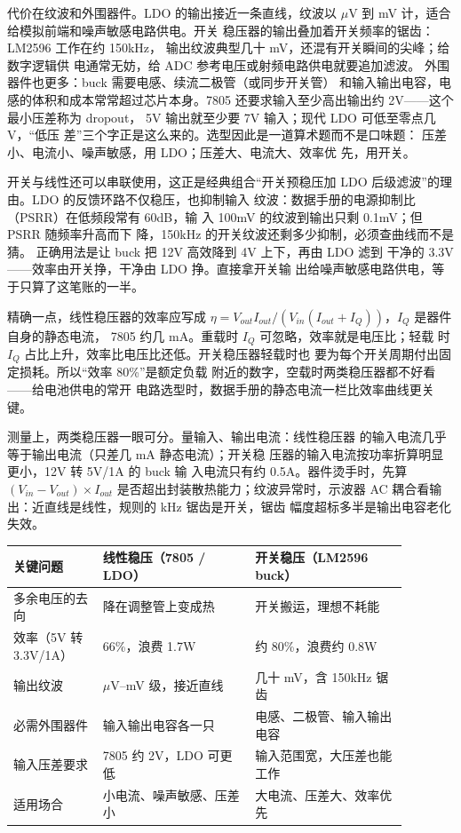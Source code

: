 代价在纹波和外围器件。LDO 的输出接近一条直线，纹波以
$\mu$V 到 mV 计，适合给模拟前端和噪声敏感电路供电。开关
稳压器的输出叠加着开关频率的锯齿：LM2596 工作在约 150kHz，
输出纹波典型几十 mV，还混有开关瞬间的尖峰；给数字逻辑供
电通常无妨，给 ADC 参考电压或射频电路供电就要追加滤波。
外围器件也更多：buck 需要电感、续流二极管（或同步开关管）
和输入输出电容，电感的体积和成本常常超过芯片本身。7805
还要求输入至少高出输出约 2V——这个最小压差称为 dropout，
5V 输出就至少要 7V 输入；现代 LDO 可低至零点几 V，“低压
差”三个字正是这么来的。选型因此是一道算术题而不是口味题：
压差小、电流小、噪声敏感，用 LDO；压差大、电流大、效率优
先，用开关。

开关与线性还可以串联使用，这正是经典组合“开关预稳压加
LDO 后级滤波”的理由。LDO 的反馈环路不仅稳压，也抑制输入
纹波：数据手册的电源抑制比（PSRR）在低频段常有 60dB，输
入 100mV 的纹波到输出只剩 0.1mV；但 PSRR 随频率升高而下
降，150kHz 的开关纹波还剩多少抑制，必须查曲线而不是猜。
正确用法是让 buck 把 12V 高效降到 4V 上下，再由 LDO 滤到
干净的 3.3V——效率由开关挣，干净由 LDO 挣。直接拿开关输
出给噪声敏感电路供电，等于只算了这笔账的一半。

精确一点，线性稳压器的效率应写成 $\eta = V_{out} I_{out}
/ (V_{in} (I_{out} + I_Q))$，$I_Q$ 是器件自身的静态电流，
7805 约几 mA。重载时 $I_Q$ 可忽略，效率就是电压比；轻载
时 $I_Q$ 占比上升，效率比电压比还低。开关稳压器轻载时也
要为每个开关周期付出固定损耗。所以“效率 80\%”是额定负载
附近的数字，空载时两类稳压器都不好看——给电池供电的常开
电路选型时，数据手册的静态电流一栏比效率曲线更关键。

测量上，两类稳压器一眼可分。量输入、输出电流：线性稳压器
的输入电流几乎等于输出电流（只差几 mA 静态电流）；开关稳
压器的输入电流按功率折算明显更小，12V 转 5V/1A 的 buck 输
入电流只有约 0.5A。器件烫手时，先算 $(V_{in}-V_{out})
\times I_{out}$ 是否超出封装散热能力；纹波异常时，示波器
AC 耦合看输出：近直线是线性，规则的 kHz 锯齿是开关，锯齿
幅度超标多半是输出电容老化失效。

\begin{longtable}{L{0.2\linewidth}L{0.34\linewidth}L{0.34\linewidth}}
\toprule
关键问题 & 线性稳压（7805 / LDO） & 开关稳压（LM2596 buck） \\
\midrule
多余电压的去向 & 降在调整管上变成热 & 开关搬运，理想不耗能 \\
效率（5V 转 3.3V/1A） & 66\%，浪费 1.7W & 约 80\%，浪费约 0.8W \\
输出纹波 & $\mu$V--mV 级，接近直线 & 几十 mV，含 150kHz 锯齿 \\
必需外围器件 & 输入输出电容各一只 & 电感、二极管、输入输出电容 \\
输入压差要求 & 7805 约 2V，LDO 可更低 & 输入范围宽，大压差也能工作 \\
适用场合 & 小电流、噪声敏感、压差小 & 大电流、压差大、效率优先 \\
\bottomrule
\end{longtable}

